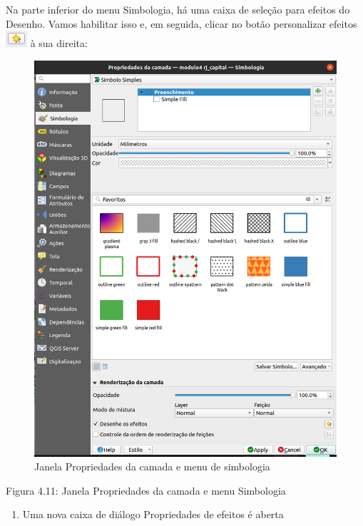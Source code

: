 \documentclass[
]{book}
\providecommand{\tightlist}{%
  \setlength{\itemsep}{0pt}\setlength{\parskip}{0pt}}
\begin{document}
Na parte inferior do menu Simbologia, há uma caixa de seleção para efeitos do Desenho. Vamos habilitar isso e, em seguida, clicar no botão personalizar efeitos \includegraphics{media/modulo4/customise-effects-button.png} à sua direita:

\begin{figure}
\centering
\includegraphics{media/modulo4/draw-effects.png}
\caption{Janela Propriedades da camada e menu de simbologia}
\end{figure}

Figura 4.11: Janela Propriedades da camada e menu Simbologia

\begin{enumerate}
\def\labelenumi{\arabic{enumi}.}
\setcounter{enumi}{2}
\tightlist
\item
  Uma nova caixa de diálogo Propriedades de efeitos é aberta
\end{enumerate}
\end{document}
